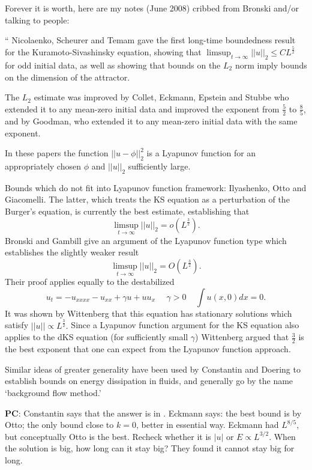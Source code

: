 \begin{description}
Forever it is worth, here are my notes (June 2008) cribbed from
Bronski and/or talking to people:

``
Nicolaenko, Scheurer and Temam gave the first long-time
boundedness result for the Kuramoto-Sivashinsky equation, showing that
$\limsup_{t \rightarrow \infty} |\!|u|\!|_2 \le C L^{\frac{5}{2}}$ for
odd initial data, as well as showing that bounds on the $L_2$ norm imply
bounds on the dimension of the attractor.

The $L_2$ estimate was improved by Collet, Eckmann, Epstein and
Stubbe who  extended it to any mean-zero initial data and
improved the exponent from $\frac{5}{2}$ to $\frac{8}{5}$, and by
Goodman, who extended it to any mean-zero initial data with the
same exponent.

In these papers the function $|\!|u-\phi|\!|_2^2$ is a Lyapunov function
for an appropriately chosen $\phi$ and $|\!|u|\!|_2$ sufficiently large.

Bounds which do not fit into Lyapunov function framework:
Ilyashenko, Otto  and Giacomelli. The
latter, which treats the KS equation as a perturbation of the Burger's
equation, is currently the best estimate, establishing that
\[
\limsup_{t \rightarrow \infty} |\!|u|\!|_2 = o(L^{\frac{3}{2}}).
\]
Bronski and Gambill give an argument of the Lyapunov
function type which establishes the slightly weaker result
\[
\limsup_{t \rightarrow \infty} |\!|u|\!|_2 = O(L^{\frac{3}{2}}).
\]
Their proof applies equally to the destabilized \KSe
\[
u_t = -u_{xxxx} - u_{xx} + \gamma  u + u u_x
~~~~~~\gamma > 0 ~~~~~ \int u(x,0)dx = 0.
\]
It was shown by Wittenberg that this equation
has stationary solutions which satisfy $|\!|u|\!| \propto L^{\frac{3}{2}}.$
Since a Lyapunov function argument for the KS equation also applies
to the dKS equation (for sufficiently small $\gamma$) Wittenberg
argued that $\frac{3}{2}$ is the best exponent that one can expect
from the Lyapunov function approach.

Similar ideas of greater generality have been used by Constantin and
Doering to establish bounds on energy dissipation in
fluids, and generally go by the name `background flow method.'

%
{\bf PC}:
Constantin says that the answer is in . Eckmann says:
the  best bound is by Otto; the only bound close to $k=0$,
better in essential way. Eckmann had
$L^{8/5}$, but conceptually Otto is the best. Recheck whether it is $|u|$
or $E \propto L^{3/2}$. When the solution is big, how long can it stay
big? They found it cannot stay big for long.


\end{description}
